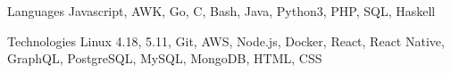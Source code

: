\begin{cvskills}
  \cvskill
  {Languages} %
  {Javascript, AWK, Go,  C, Bash, Java, Python3, PHP, SQL, Haskell} %

  \cvskill
    {Technologies} %
    {Linux 4.18, 5.11, Git, AWS, Node.js, Docker, React, React Native, GraphQL, PostgreSQL, MySQL, MongoDB, HTML, CSS} %
\end{cvskills}

